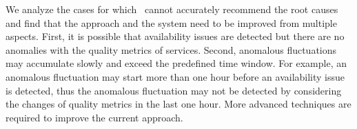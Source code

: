We analyze the cases for which \app~cannot accurately recommend the root causes and find that the approach and the system need to be improved from multiple aspects.
First, it is possible that availability issues are detected but there are no anomalies with the quality metrics of services.
Second, anomalous fluctuations may accumulate slowly and exceed the predefined time window.
For example, an anomalous fluctuation may start more than one hour before an availability issue is detected, thus the anomalous fluctuation may not be detected by considering the changes of quality metrics in the last one hour.
More advanced techniques are required to improve the current approach.




